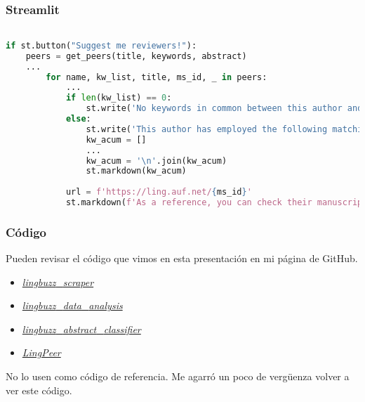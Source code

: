 \documentclass{beamer}
\begin{document}
\begin{frame}[fragile]
\frametitle{Streamlit}
\begin{lstlisting}[language=Python]

if st.button("Suggest me reviewers!"):
	peers = get_peers(title, keywords, abstract)
	...
    	for name, kw_list, title, ms_id, _ in peers:
        	...
            if len(kw_list) == 0:
            	st.write('No keywords in common between this author and the info you provided.')  
            else:
                st.write('This author has employed the following matching keywords.')
                kw_acum = []
				...
                kw_acum = '\n'.join(kw_acum)
                st.markdown(kw_acum)
    
            url = f'https://ling.auf.net/{ms_id}'
            st.markdown(f'As a reference, you can check their manuscript *[{title}]({url})*.')

\end{lstlisting}
\end{frame}


\begin{frame}
\frametitle{Código}

Pueden revisar el código que vimos en esta presentación en mi página de GitHub.

\begin{itemize}

\item[\ding{52}] \href{https://github.com/cmunozperez/lingbuzz_scraper}{\alert{\textit{lingbuzz{\_}scraper}}}

\item[\ding{52}] \href{https://github.com/cmunozperez/lingbuzz_data_analysis}{\alert{\textit{lingbuzz{\_}data{\_}analysis}}}

\item[\ding{52}] \href{https://github.com/cmunozperez/ling_abstract_classifier}{\alert{\textit{lingbuzz{\_}abstract{\_}classifier}}}

\item[\ding{52}] \href{https://github.com/cmunozperez/LingPeer}{\alert{\textit{LingPeer}}}


\end{itemize}

No lo usen como código de referencia. Me agarró un poco de vergüenza volver a ver este código.

\end{frame}
\end{document}
